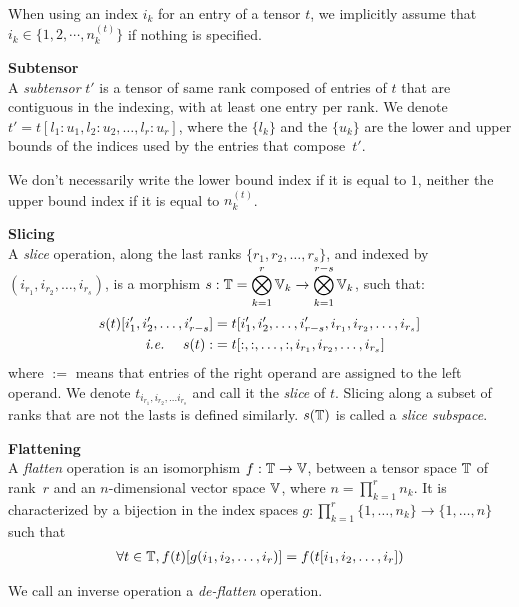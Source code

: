 \begin{remark}
When using an index $i_k$ for an entry of a tensor $t$, we implicitly assume that $i_k \in \{1, 2, \cdots, n_k^{(t)}\}$ if nothing is specified.
\end{remark}

\begin{definition}\textbf{Subtensor}\\
A \emph{subtensor} $t'$ is a tensor of same rank composed of entries of $t$ that are contiguous in the indexing, with at least one entry per rank. We denote $t' = t[l_1{:}u_1, l_2{:}u_2, \ldots, l_r{:}u_r]$, where the $\{l_k\}$ and the $\{u_k\}$ are the lower and upper bounds of the indices used by the entries that compose~$t'$.
\end{definition}

\begin{remark}
We don't necessarily write the lower bound index if it is equal to $1$, neither the upper bound index if it is equal to $n_k^{(t)}$.
\end{remark}

\begin{definition}\textbf{Slicing}\\
A \emph{slice} operation, along the last ranks $\{r_1, r_2, \ldots, r_s\}$, and indexed by $(i_{r_1}, i_{r_2}, \ldots, i_{r_s})$, is a morphism $s: \mathbb{T} = \displaystyle \bigotimes_{k=1}^r \mathbb{V}_k \rightarrow \displaystyle \bigotimes_{k=1}^{r-s} \mathbb{V}_k$, such that:
\begin{align*}
s(t)[i'_1, i'_2, \ldots, i'_{r-s}] &= t[i'_1, i'_2, \ldots, i'_{r-s}, i_{r_1}, i_{r_2}, \ldots, i_{r_s}] \\
\text{ \emph{i.e.}~} \quad s(t) :&= t[:,:, \ldots, :, i_{r_1}, i_{r_2}, \ldots, i_{r_s}]
\end{align*}
where $:=$ means that entries of the right operand are assigned to the left operand.
We denote $t_{i_{r_1}, i_{r_2}, \ldots i_{r_s}}$ and call it the \emph{slice} of $t$. 
Slicing along a subset of ranks that are not the lasts is defined similarly.
$s(\mathbb{T})$ is called a \emph{slice subspace}.
\end{definition}

\begin{definition}\textbf{Flattening}\\
A \emph{flatten} operation is an isomorphism $f: \mathbb{T} \rightarrow \mathbb{V}$, between a tensor space $\mathbb{T}$ of rank~$r$ and an $n$-dimensional vector space $\mathbb{V}$, where $n =\displaystyle \prod_{k=1}^r n_k$. It is characterized by a bijection in the index spaces $g: \displaystyle \prod_{k=1}^r \{1, \ldots, n_k \} \rightarrow\{1, \ldots, n \}$ such that
\begin{gather*}
  \forall t \in \mathbb{T}, f(t)[g(i_1, i_2, \ldots, i_r)] = f(t[i_1, i_2, \ldots, i_r])
\end{gather*}

We call an inverse operation a \emph{de-flatten} operation.
\end{definition}

